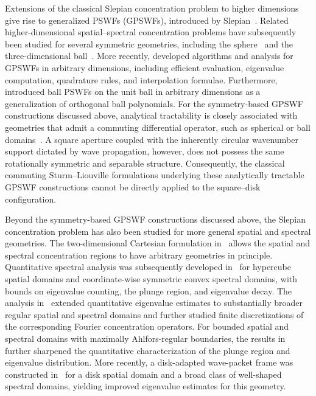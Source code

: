 \documentclass[lettersize,journal]{IEEEtran}
\theoremstyle{plain}
\begin{document}
Extensions of the classical Slepian concentration problem to higher dimensions give rise to generalized PSWFs (GPSWFs), introduced by Slepian~\cite{Slepian1964Prolate}.
Related higher-dimensional spatial--spectral concentration problems have subsequently been studied for several symmetric geometries, including the sphere~\cite{simons2006spatiospectral} and the three-dimensional ball~\cite{KHALID2016470}. More recently, \cite{greengard2024generalized} developed algorithms and analysis for GPSWFs in arbitrary dimensions, including efficient evaluation, eigenvalue computation, quadrature rules, and interpolation formulae. Furthermore, \cite{ZHANG2020539} introduced ball PSWFs on the unit ball in arbitrary dimensions as a generalization of orthogonal ball polynomials. For the symmetry-based GPSWF constructions discussed above, analytical tractability is closely associated with geometries that admit a commuting differential operator, such as spherical or ball domains~\cite{simons2006spatiospectral,ZHANG2020539}. A square aperture coupled with the inherently circular wavenumber support dictated by wave propagation, however, does not possess the same rotationally symmetric and separable structure. Consequently, the classical commuting Sturm--Liouville formulations underlying these analytically tractable GPSWF constructions cannot be directly applied to the square--disk configuration.

Beyond the symmetry-based GPSWF constructions discussed above, the Slepian concentration problem has also been studied for more general spatial and spectral geometries. The two-dimensional Cartesian formulation in~\cite{simons2011cartesian} allows the spatial and spectral concentration regions to have arbitrary geometries in principle. Quantitative spectral analysis was subsequently developed in~\cite{israel2024eigenvalue} for hypercube spatial domains and coordinate-wise symmetric convex spectral domains, with bounds on eigenvalue counting, the plunge region, and eigenvalue decay. The analysis in~\cite{marceca2024eigenvalue} extended quantitative eigenvalue estimates to substantially broader regular spatial and spectral domains and further studied finite discretizations of the corresponding Fourier concentration operators. For bounded spatial and spectral domains with maximally Ahlfors-regular boundaries, the results in~\cite{hughes2025eigenvalueII} further sharpened the quantitative characterization of the plunge region and eigenvalue distribution. More recently, a disk-adapted wave-packet frame was constructed in~\cite{hughes2026wavepackets} for a disk spatial domain and a broad class of well-shaped spectral domains, yielding improved eigenvalue estimates for this geometry. 
\end{document}
